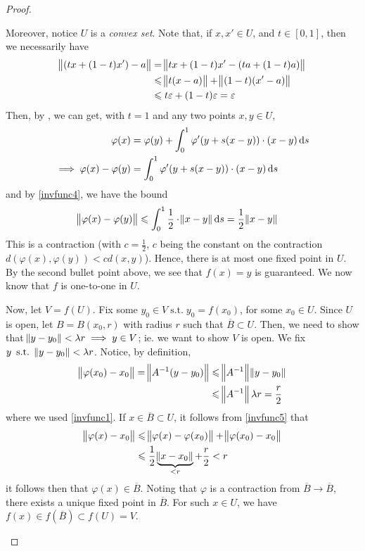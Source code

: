 \documentclass{amsart} %
\theoremstyle{mytheoremstyle}
\theoremstyle{definition}
\numberwithin{equation}{section}
\DeclareMathOperator{\1}{\mathbbm{1}}
\DeclareMathOperator{\suchthat}{\text{ s.t. }}
\renewcommand{\leq}{\leqslant}
\renewcommand{\leq}{\leqslant}
\begin{document}
\begin{proof}
\begin{enumerate}[label=(\arabic*)]
		Moreover, notice $U$ is a \textit{convex set}. Note that, if $x,x' \in U$, and $t \in[0,1]$, then we necessarily have
		\begin{align*}
		\norm{ (tx + (1-t)x') - a } &= \norm{tx + (1-t)x' - (ta + (1-t)a ) }  \\
		&\leq \norm{t(x-a)} + \norm{(1-t)(x'-a)}  \\
		&\leq t \varepsilon + (1-t) \varepsilon = \varepsilon 
		\end{align*}
		Then, by , we can get, with $t=1$ and any two points $x,y \in U$,
		\begin{align*}
		\varphi(x )&= \varphi(y) + \int_{0}^{1} \varphi' (y+s(x-y) ) \cdot (x-y) \dif s \\
		\implies \varphi(x )- \varphi(y)& = \int_{0}^{1} \varphi' (y+s(x-y) ) \cdot (x-y) \dif s
		\end{align*}
		and by \eqref{invfunc4}, we have the bound
		\begin{align}
		\label{invfunc5}
		\norm{\varphi(x )- \varphi(y)} &\leq \int_{0}^{1} \frac{1}{2} \cdot \norm{x-y} \dif s = \frac{1}{2} \norm{x-y}
		\end{align}
		This is a contraction (with $c=\frac{1}{2}$, $c$ being the constant on the contraction $d(\varphi(x), \varphi(y) ) < c d(x,y)$). Hence, there is at most one fixed point in $U$. By the second bullet point above, we see that $f(x)=y$ is guaranteed. We now know that $f$ is one-to-one in $U$.
		
		Now, let $V=f(U)$. Fix some $y_0 \in V \suchthat y_0 = f(x_0)$, for some $x_0\in U$. Since $U$ is open, let $B = B(x_0,r)$ with radius $r$ such that $\overline{B} \subset U$. Then, we need to show that $\norm{y - y_0} < \lambda r \implies  y \in V $; ie. we want to show $V$ is open. We fix $y \suchthat \norm{y - y_0} < \lambda r$. Notice, by definition,
		\begin{align*}
		\norm{\varphi(x_0) - x_0} = \norm{A^{-1} (y-y_0)} &\leq \norm{A^{-1}} \norm{y-y_0} \\
		&\leq  \norm{A^{-1}} \lambda r = \frac{r}{2}
		\end{align*}
		where we used \eqref{invfunc1}. If $x \in \overline{B} \subset U$, it follows from \eqref{invfunc5} that
		\begin{align*}
		\norm{\varphi(x) - x_0} &\leq \norm{\varphi(x) - \varphi (x_0)} + \norm{\varphi (x_0) - x_0 } \\
		&\leq  \frac{1}{2} \underbrace{\norm{x - x_0}}_{<r} + \frac{r}{2} < r
		\end{align*}
		it follows then that $\varphi (x) \in \overline{B}$. Noting that $\varphi$ is a contraction from $\overline{B} \to \overline{B}$, there exists a unique fixed point in $\overline{B}$. For such $x \in U$, we have $f(x) \in f(\overline{B}) \subset f(U) = V$.
		

\end{enumerate}
\end{proof}
\end{document}
